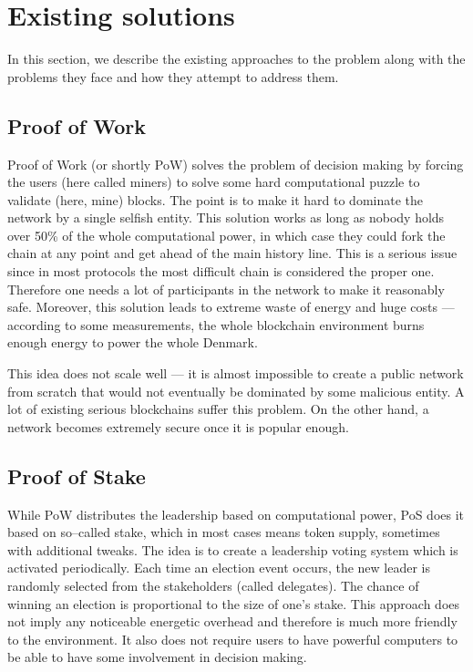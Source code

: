 \section{Existing solutions}

In this section, we describe the existing approaches to the problem along with
the problems they face and how they attempt to address them.

\subsection{Proof of Work}

Proof of Work (or shortly PoW) solves the problem of decision making by forcing
the users (here called miners) to solve some hard computational puzzle to
validate (here, mine) blocks\cite{bitcoin}. The point is to make it hard to
dominate the network by a single selfish entity. This solution works as long as
nobody holds over 50\% of the whole computational power, in which case they
could fork the chain at any point and get ahead of the main history line. This
is a serious issue since in most protocols the most difficult chain is
considered the proper one. Therefore one needs a lot of participants in the
network to make it reasonably safe. Moreover, this solution leads to extreme
waste of energy and huge costs — according to some measurements, the whole
blockchain environment burns enough energy to power the whole
Denmark\cite{bitcoin_energy}.

This idea does not scale well — it is almost impossible to create a public
network from scratch that would not eventually be dominated by some malicious
entity. A lot of existing serious blockchains suffer this
problem\cite{51attack}. On the other hand, a network becomes extremely secure
once it is popular enough.

\subsection{Proof of Stake}

While PoW distributes the leadership based on computational power, PoS does it
based on so–called stake, which in most cases means token supply, sometimes with
additional tweaks\cite{peercoin}\cite{cryptocurr_without_pow}. The idea is to
create a leadership voting system which is activated periodically. Each time an
election event occurs, the new leader is randomly selected from the stakeholders
(called delegates). The chance of winning an election is proportional to the
size of one's stake. This approach does not imply any noticeable energetic
overhead and therefore is much more friendly to the environment. It also does
not require users to have powerful computers to be able to have some involvement
in decision making.


